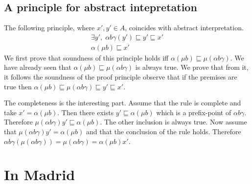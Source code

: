\documentclass{llncs}
\begin{document}
\subsection{A principle for abstract intepretation}


The following principle, where $x',y' \in A$, coincides with abstract interpretation.
\begin{equation}%
 \begin{array}{c}
    \exists y', \;  \alpha b \gamma(y') \sqsubseteq y'\sqsubseteq x' \\
    \hline %
    \alpha(\mu b) \sqsubseteq x'
\end{array}
\end{equation}
%
We first prove that soundness of this principle holds iff $\alpha(\mu b ) \sqsubseteq \mu (\alpha b \gamma )$. We have already seen that $\alpha(\mu b ) \sqsubseteq \mu (\alpha b \gamma )$ is always true. We prove that from it, it follows the soundness of the proof principle observe that if the premises are true then $\alpha(\mu b ) \sqsubseteq \mu (\alpha b \gamma ) \sqsubseteq y' \sqsubseteq x'$.  

The completeness is the interesting part. Assume that the rule is complete and take $x' = \alpha(\mu b)$. Then there exists $y'\sqsubseteq \alpha(\mu b)$ which is a prefix-point of  $\alpha b \gamma$. Therefore $\mu(\alpha b \gamma) y'\sqsubseteq  \alpha(\mu b)$. The other inclusion is always true.
Now assume that $\mu(\alpha b \gamma) y' =  \alpha(\mu b)$ and that the conclusion of the rule holds. Therefore $ \alpha b \gamma (\mu(\alpha b \gamma))  = \mu(\alpha b \gamma)  =  \alpha(\mu b) x' $.




\section{In Madrid}




%
%
\end{document}
